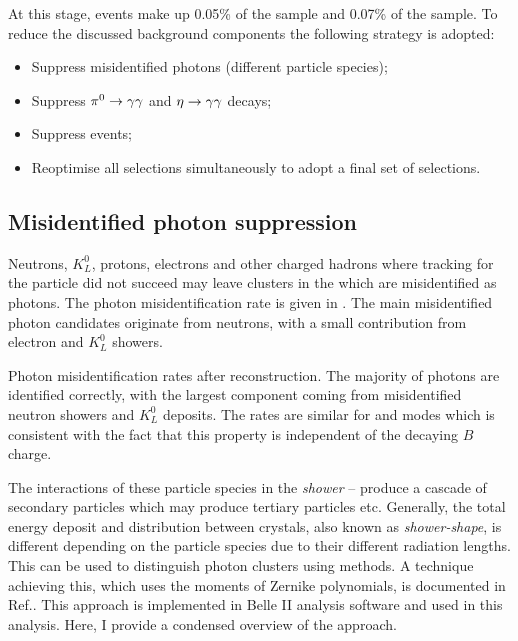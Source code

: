 At this stage, \BtoXsgamma events make up 0.05\% of the \feiBp sample and 0.07\% of the \feiBz sample.
To reduce the discussed background components the following strategy is adopted:
\begin{itemize}
    \item Suppress misidentified photons (different particle species);
    \item Suppress $\pi^0\rightarrow\gamma\gamma$ and $\eta\rightarrow\gamma\gamma$ decays;
    \item Suppress \epem\ra\qqbar events;
    \item Reoptimise all selections simultaneously to adopt a final set of selections.
\end{itemize}

\subsection{Misidentified photon suppression}\label{sec:selection_clusZMVA}

Neutrons, $K_L^0$, protons, electrons and other charged hadrons where tracking for the particle did not succeed may leave clusters in the \ECL which are misidentified as photons.
The photon misidentification rate is given in .
The main misidentified photon candidates originate from neutrons, with a small contribution from electron and $K_L^0$ showers.

\begin{table}[htbp!]
    \centering
    \caption{\label{tab:misidentified_photons} Photon misidentification rates after reconstruction.
    The majority of photons are identified correctly, with the largest component coming from misidentified neutron showers and $K_L^0$ deposits.
    The rates are similar for \feiBp and \feiBz modes which is consistent with the fact that this property is independent of the decaying $B$ charge.}
    
\end{table}

The interactions of these particle species in the \ECL \textit{shower} -- produce a cascade of secondary particles which may produce tertiary particles etc.
Generally, the total energy deposit and distribution between \ECL crystals, also known as \textit{shower-shape}, is different depending on the particle species due to their different radiation lengths.
This can be used to distinguish photon clusters using \MVA methods.
A technique achieving this, which uses the moments of Zernike polynomials, is documented in Ref.\cite{Hershenhorn:2468}.
This approach is implemented in Belle II analysis software and used in this analysis.
Here, I provide a condensed overview of the approach.

